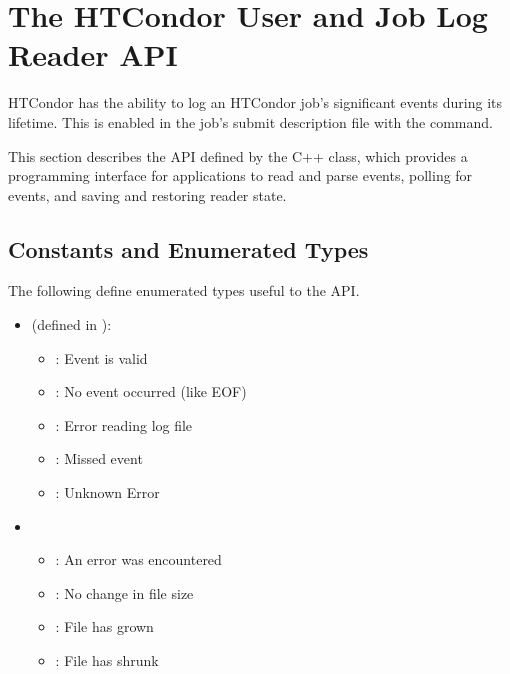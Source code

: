 \section{The HTCondor User and Job Log Reader API}\label{sec:job-log-reader}

HTCondor has the ability to log an HTCondor job's significant events during 
its lifetime.
This is enabled in the job's submit description file with the
 command.

This section describes the API defined by the C++  class,
which provides a programming interface for applications
to read and parse events,
polling for events, and saving and restoring reader state.

\subsection{Constants and Enumerated Types}

The following define enumerated types useful to the API.

\begin{itemize}
\item {} (defined in ):
  \begin{itemize}
    \item {}: Event is valid
    \item {}: No event occurred (like EOF)
    \item {}: Error reading log file
    \item {}: Missed event
    \item {}: Unknown Error
  \end{itemize}

\item {}
  \begin{itemize}
    \item {}: An error was encountered
    \item {}: No change in file size
    \item {}: File has grown
    \item {}: File has shrunk
  \end{itemize}

\end{itemize}


